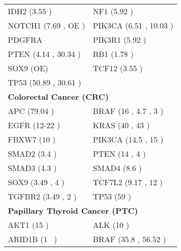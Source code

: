 \documentclass[a4paper,12pt]{article}
\begin{document}
\begin{table}[!htb]
\begin{tabular}{ll}
IDH2 (3.55  \cite{Cohen2013}) & NF1 (5.92  \cite{Parsons2008, McLendonR2008, Rubio-Perez2015}) \\ NOTCH1 (7.69 \cite{Rubio-Perez2015} , OE \cite{Xu2013}) & PIK3CA (6.51  \cite{Rubio-Perez2015}, 10.03  \cite{McLendonR2008, Parsons2008, Gallia2006, Kita2007}) \\
PDGFRA \cite{Ozawa2010, Chakravarty2017} & PIK3R1 (5.92  \cite{McLendonR2008, Parsons2008, Quayle2012, Rubio-Perez2015}) \\ PTEN (4.14  \cite{Rubio-Perez2015}, 30.34  \cite{McLendonR2008, Parsons2008}) & RB1 (1.78  \cite{McLendonR2008, Parsons2008, Rubio-Perez2015}) \\
SOX9 (OE\cite{Wang2012, Gao2015}) & TCF12 (3.55  \cite{Labreche2015}) \\ TP53 (50.89 \cite{Rubio-Perez2015}, 30.61 \cite{McLendonR2008, Parsons2008}) & \\ \hline
\multicolumn{2}{l}{{\bf Colorectal Cancer (CRC)}}\\ \hline
APC (79.04 \cite{CancerGenomAtlas2012} ) & BRAF (16 \cite{Berg2010}, 4.7 \cite{DeRoock2010}, 3 \cite{Mao2015, CancerGenomAtlas2012}) \\ EGFR (12-22 \cite{Zhang2008a, Oh2011, Gross1991} ) & KRAS (40 \cite{DeRoock2010}, 43 \cite{Berg2010, Bos1987, CancerGenomAtlas2012, Mao2015}) \\
FBXW7 (10 \cite{CancerGenomAtlas2012} ) & PIK3CA (14.5 \cite{DeRoock2010}, 15 \cite{CancerGenomAtlas2012, Mao2015, Hao2016, Berg2010}) \\ SMAD2 (3.4 \cite{Roper2013, CancerGenomAtlas2012} ) & PTEN (14 \cite{Berg2010}, 4 \cite{DeRoock2010, Ngeow2013, Molinari2013, Mao2015, CancerGenomAtlas2012}) \\
SMAD3 (4.3 \cite{Roper2013, CancerGenomAtlas2012} ) & SMAD4 (8.6 \cite{Roper2013, Miyaki1999, CancerGenomAtlas2012}) \\ SOX9 (3.49 \cite{Rubio-Perez2015}, 4 \cite{Lu2008, CancerGenomAtlas2012}) & TCF7L2 (9.17 \cite{Rubio-Perez2015, Folsom2008}, 12 \cite{CancerGenomAtlas2012}) \\
TGFBR2 (3.49 \cite{Rubio-Perez2015}, 2 \cite{Xu2007, CancerGenomAtlas2012}) & TP53 (59 \cite{CancerGenomAtlas2012}) \\ \hline
\multicolumn{2}{l}{{\bf Papillary Thyroid Cancer (PTC)}}\\ \hline
AKT1 (15 \cite{Xing2013} ) & ALK (10 \cite{Xing2013} ) \\ ARID1B (1 \cite{Agrawal2014}\, \cite{Landa2016} ) & BRAF (35.8 \cite{Kimura2003}, 56.52 \cite{Rubio-Perez2015} ) \\

\end{tabular}
\end{table}
\end{document}

